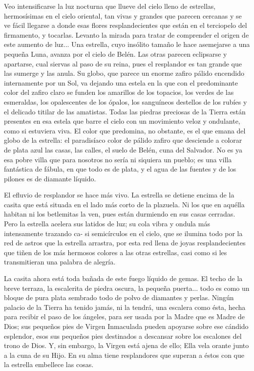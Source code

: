 \documentclass[12pt, twoside, openright]{book} %
\begin{document}
Veo intensificarse la luz nocturna que llueve del cielo lleno de estrellas, hermosísimas en el cielo oriental, tan vivas y grandes que parecen cercanas y se ve fácil llegarse a donde esas flores resplandecientes que están en el terciopelo del firmamento, y tocarlas. Levanto la mirada para tratar de comprender el origen de este aumento de luz... Una estrella, cuyo insólito tamaño le hace asemejarse a una pequeña Luna, avanza por el cielo de Belén. Las otras parecen eclipsarse y apartarse, cual siervas al paso de su reina, pues el resplandor es tan grande que las sumerge y las anula. Su globo, que parece un enorme zafiro pálido encendido internamente por un Sol, va dejando una estela en la que con el predominante color del zafiro claro se funden los amarillos de los topacios, los verdes de las esmeraldas, los opalescentes de los ópalos, los sanguíneos destellos de los rubíes y el delicado titilar de las amatistas. Todas las piedras preciosas de la Tierra están presentes en esa estela que barre el cielo con un movimiento veloz y ondulante, como si estuviera viva. El color que predomina, no obstante, es el que emana del globo de la estrella: el paradisíaco color de pálido zafiro que desciende a colorar de plata azul las casas, las calles, el suelo de Belén, cuna del Salvador. No es ya esa pobre villa que para nosotros no sería ni siquiera un pueblo; es una villa fantástica de fábula, en que todo es de plata, y el agua de las fuentes y de los pilones es de diamante líquido. 

El efluvio de resplandor se hace más vivo. La estrella se detiene encima de la casita que está situada en el lado más corto de la plazuela. Ni los que en aquélla habitan ni los betlemitas la ven, pues están durmiendo en sus casas cerradas. Pero la estrella acelera sus latidos de luz; su cola vibra y ondula más intensamente trazando ca- si semicírculos en el cielo, que se ilumina todo por la red de astros que la estrella arrastra, por esta red llena de joyas resplandecientes que tiñen de los más hermosos colores a las otras estrellas, casi como si les transmitieran una palabra de alegría. 

La casita ahora está toda bañada de este fuego líquido de gemas. El techo de la breve terraza, la escalerita de piedra oscura, la pequeña puerta... todo es como un bloque de pura plata sembrado todo de polvo de diamantes y perlas. Ningún palacio de la Tierra ha tenido jamás, ni la tendrá, una escalera como ésta, hecha para recibir el paso de los ángeles, para ser usada por la Madre que es Madre de Dios; sus pequeños pies de Virgen Inmaculada pueden apoyarse sobre ese cándido esplendor, esos sus pequeños pies destinados a descansar sobre los escalones del trono de Dios. Y, sin embargo, la Virgen está ajena de ello; Ella vela orante junto a la cuna de su Hijo. En su alma tiene resplandores que superan a éstos con que la estrella embellece las cosas. 
\end{document}
